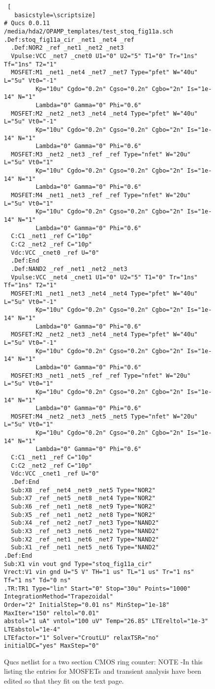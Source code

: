 \begin{figure}

 \begin{lstlisting} [
   basicstyle=\scriptsize]   
# Qucs 0.0.11  /media/hda2/OPAMP_templates/test_stoq_fig11a.sch
.Def:stoq_fig11a_cir _net1 _net4 _ref
  .Def:NOR2 _ref _net1 _net2 _net3
  Vpulse:VCC _net7 _cnet0 U1="0" U2="5" T1="0" Tr="1ns" Tf="1ns" T2="1"
  MOSFET:M1 _net1 _net4 _net7 _net7 Type="pfet" W="40u" L="5u" Vt0="-1" 
         Kp="10u" Cgdo="0.2n" Cgso="0.2n" Cgbo="2n" Is="1e-14" N="1" 
         Lambda="0" Gamma="0" Phi="0.6"
  MOSFET:M2 _net2 _net3 _net4 _net4 Type="pfet" W="40u" L="5u" Vt0="-1" 
         Kp="10u" Cgdo="0.2n" Cgso="0.2n" Cgbo="2n" Is="1e-14" N="1" 
         Lambda="0" Gamma="0" Phi="0.6"
  MOSFET:M3 _net2 _net3 _ref _ref Type="nfet" W="20u" L="5u" Vt0="1" 
         Kp="10u" Cgdo="0.2n" Cgso="0.2n" Cgbo="2n" Is="1e-14" N="1" 
         Lambda="0" Gamma="0" Phi="0.6"
  MOSFET:M4 _net1 _net3 _ref _ref Type="nfet" W="20u" L="5u" Vt0="1" 
         Kp="10u" Cgdo="0.2n" Cgso="0.2n" Cgbo="2n" Is="1e-14" N="1" 
         Lambda="0" Gamma="0" Phi="0.6"
  C:C1 _net1 _ref C="10p"
  C:C2 _net2 _ref C="10p"
  Vdc:VCC _cnet0 _ref U="0"
  .Def:End
  .Def:NAND2 _ref _net1 _net2 _net3
  Vpulse:VCC _net4 _cnet1 U1="0" U2="5" T1="0" Tr="1ns" Tf="1ns" T2="1"
  MOSFET:M1 _net1 _net3 _net4 _net4 Type="pfet" W="40u" L="5u" Vt0="-1" 
         Kp="10u" Cgdo="0.2n" Cgso="0.2n" Cgbo="2n" Is="1e-14" N="1" 
         Lambda="0" Gamma="0" Phi="0.6"
  MOSFET:M2 _net2 _net3 _net4 _net4 Type="pfet" W="40u" L="5u" Vt0="-1" 
         Kp="10u" Cgdo="0.2n" Cgso="0.2n" Cgbo="2n" Is="1e-14" N="1" 
         Lambda="0" Gamma="0" Phi="0.6"
  MOSFET:M3 _net1 _net5 _ref _ref Type="nfet" W="20u" L="5u" Vt0="1" 
         Kp="10u" Cgdo="0.2n" Cgso="0.2n" Cgbo="2n" Is="1e-14" N="1" 
         Lambda="0" Gamma="0" Phi="0.6"
  MOSFET:M4 _net2 _net3 _net5 _net5 Type="nfet" W="20u" L="5u" Vt0="1" 
         Kp="10u" Cgdo="0.2n" Cgso="0.2n" Cgbo="2n" Is="1e-14" N="1" 
         Lambda="0" Gamma="0" Phi="0.6"
  C:C1 _net1 _ref C="10p"
  C:C2 _net2 _ref C="10p"
  Vdc:VCC _cnet1 _ref U="0"
  .Def:End
  Sub:X8 _ref _net4 _net9 _net5 Type="NOR2"
  Sub:X7 _ref _net5 _net8 _net4 Type="NOR2"
  Sub:X6 _ref _net1 _net8 _net9 Type="NOR2"
  Sub:X5 _ref _net1 _net2 _net8 Type="NOR2"
  Sub:X4 _ref _net2 _net7 _net3 Type="NAND2"
  Sub:X3 _ref _net3 _net6 _net2 Type="NAND2"
  Sub:X2 _ref _net1 _net6 _net7 Type="NAND2"
  Sub:X1 _ref _net1 _net5 _net6 Type="NAND2"
.Def:End
Sub:X1 vin vout gnd Type="stoq_fig11a_cir"
Vrect:V1 vin gnd U="5 V" TH="1 us" TL="1 us" Tr="1 ns" Tf="1 ns" Td="0 ns"
.TR:TR1 Type="lin" Start="0" Stop="30u" Points="1000" IntegrationMethod="Trapezoidal" 
Order="2" InitialStep="0.01 ns" MinStep="1e-18" MaxIter="150" reltol="0.01" 
abstol="1 uA" vntol="100 uV" Temp="26.85" LTEreltol="1e-3" LTEabstol="1e-4" 
LTEfactor="1" Solver="CroutLU" relaxTSR="no" initialDC="yes" MaxStep="0"

\end{lstlisting} 
 \caption{Qucs netlist for a two section CMOS ring counter: NOTE -In this listing the entries for MOSFETs and transient analysis have been edited so that they fit on the text page.}
\label{fig:stoq_fig12}
\end{figure}   

